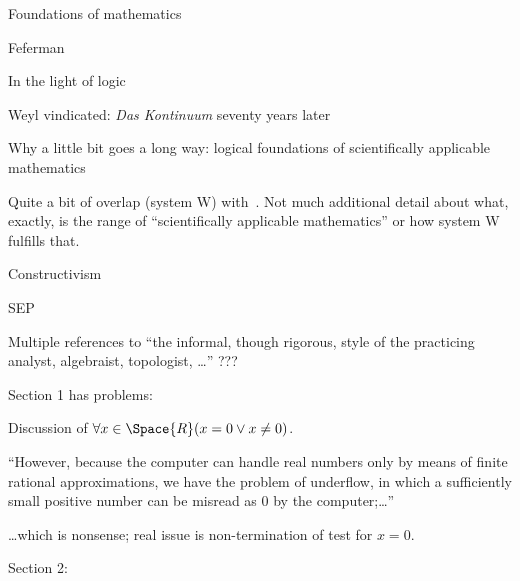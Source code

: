 \begin{plSection}{Foundations of mathematics}
\begin{plSection}{Feferman}
\begin{plSection}{In the light of logic}
\begin{plSection}{Weyl vindicated: \textit{Das Kontinuum} seventy years later}
\end{plSection}%
\begin{plSection}{Why a little bit goes a long way:
logical foundations of scientifically applicable mathematics}
\label{sec:Why_a_little_bit_goes_a_long_way}

\cite[ch~14 ``Why a little bit goes a long way:
logical foundations of scientifically applicable mathematics'']{Feferman:1998:LightOfLogic}

Quite a bit of overlap (system W) 
with~\cite[ch 13]{Feferman:1998:LightOfLogic}.
Not much additional detail about what, exactly,
is the range of ``scientifically applicable mathematics''
or how system W fulfills that.

\end{plSection}%
\end{plSection}%
\end{plSection}%
\begin{plSection}{Constructivism}
\label{sec:Constructivism}
\begin{plSection}{SEP}
\label{sec:Constructivism_SEP}
\cite{sep:ConstructiveMathematics}

Multiple references to ``the informal, though rigorous, 
style of the practicing analyst, algebraist, topologist, \ldots''
???

Section 1 has problems:

Discussion of
$ \forall x \in \Space{R} (x = 0 \vee x \ne 0)$.

``However, because the computer can handle real numbers 
only by means of finite rational approximations, 
we have the problem of underflow, 
in which a sufficiently small positive number can be misread as 0 
by the computer;\ldots''

\ldots which is nonsense;
real issue is non-termination of test for $x=0$.

Section 2:


\end{plSection}
\end{plSection}
\end{plSection}

